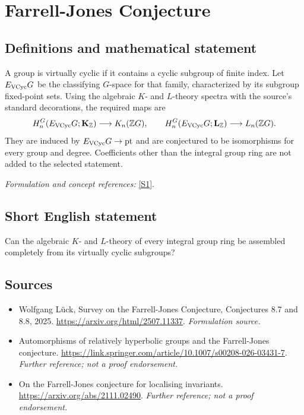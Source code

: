 \documentclass[11pt]{article}
\begin{document}
\section*{\texorpdfstring{Farrell-Jones Conjecture}{Farrell-Jones Conjecture}}\label{1452}
\subsection{Definitions and mathematical statement}
A group is virtually cyclic if it contains a cyclic subgroup of finite index. Let $E_{\rm VCyc}G$ be the classifying $G$-space for that family, characterized by its subgroup fixed-point sets. Using the algebraic $K$- and $L$-theory spectra with the source's standard decorations, the required maps are
\[
 H_n^G(E_{\rm VCyc}G;\mathbf K_{{\mathbb{Z}}})\longrightarrow K_n({\mathbb{Z}} G),\qquad
 H_n^G(E_{\rm VCyc}G;\mathbf L_{{\mathbb{Z}}})\longrightarrow L_n({\mathbb{Z}} G).
\]
They are induced by $E_{\rm VCyc}G\to\mathrm{pt}$ and are conjectured to be isomorphisms for every group and degree. Coefficients other than the integral group ring are not added to the selected statement.
\par\smallskip\textit{Formulation and concept references:} \href{https://arxiv.org/html/2507.11337}{[S1]}.

\subsection{Short English statement}
Can the algebraic $K$- and $L$-theory of every integral group ring be assembled completely from its virtually cyclic subgroups?
\subsection{Sources}
\begin{itemize}
\item[S1]Wolfgang Lück, Survey on the Farrell-Jones Conjecture, Conjectures 8.7 and 8.8, 2025.
\url{https://arxiv.org/html/2507.11337}.
\textit{Formulation source.}
\item[S2]Automorphisms of relatively hyperbolic groups and the Farrell-Jones conjecture.
\url{https://link.springer.com/article/10.1007/s00208-026-03431-7}.
\textit{Further reference; not a proof endorsement.}
\item[S3]On the Farrell-Jones conjecture for localising invariants.
\url{https://arxiv.org/abs/2111.02490}.
\textit{Further reference; not a proof endorsement.}
\end{itemize}
\end{document}
